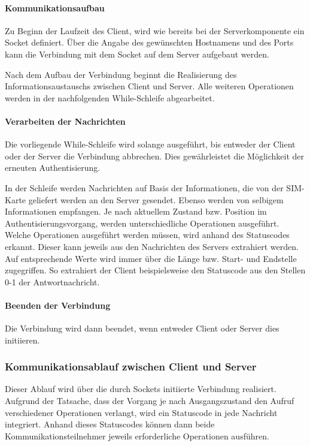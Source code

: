         \paragraph{Kommunikationsaufbau} Zu Beginn der Laufzeit des Client, wird wie bereits bei der 
        Serverkomponente ein Socket definiert. Über die Angabe des gewünschten Hostnamens und des Ports
        kann die Verbindung mit dem Socket auf dem Server aufgebaut werden.

        Nach dem Aufbau der Verbindung beginnt die Realisierung des Informationsaustauschs zwischen
        Client und Server.
        Alle weiteren Operationen werden in der nachfolgenden While-Schleife abgearbeitet.

        \paragraph{Verarbeiten der Nachrichten} Die vorliegende While-Schleife wird solange ausgeführt,
        bis entweder der Client oder der Server die Verbindung abbrechen. Dies gewährleistet die
        Möglichkeit der erneuten Authentisierung.

        In der Schleife werden Nachrichten auf Basis der Informationen, die von der SIM-Karte geliefert werden
        an den Server gesendet. Ebenso werden von selbigem Informationen empfangen. Je nach aktuellem Zustand
        bzw. Position im Authentisierungsvorgang, werden unterschiedliche Operationen ausgeführt.
        Welche Operationen ausgeführt werden müssen, wird anhand des Statuscodes erkannt. Dieser kann
        jeweils aus den Nachrichten des Servers extrahiert werden. Auf entsprechende Werte wird immer
        über die Länge bzw. Start- und Endstelle zugegriffen. So extrahiert der Client beispielsweise
        den Statuscode aus den Stellen 0-1 der Antwortnachricht.

        \paragraph{Beenden der Verbindung} Die Verbindung wird dann beendet, wenn entweder Client
        oder Server dies initiieren. 
	
    \subsubsection{Kommunikationsablauf zwischen Client und Server}
    Dieser Ablauf wird über die durch Sockets initiierte Verbindung realisiert. Aufgrund
    der Tatsache, dass der Vorgang je nach Ausgangszustand den Aufruf verschiedener Operationen
    verlangt, wird ein Statuscode in jede Nachricht integriert. Anhand dieses Statuscodes
    können dann beide Kommunikationsteilnehmer jeweils erforderliche Operationen ausführen.


